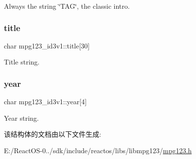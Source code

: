 Always the string \char`\"{}\+T\+A\+G\char`\"{}, the classic intro. \mbox{\label{structmpg123__id3v1_a07f4a232c9be375fc35285538ff08c98}} 
\subsubsection{\texorpdfstring{title}{title}}
{\footnotesize\ttfamily char mpg123\+\_\+id3v1\+::title\mbox{[}30\mbox{]}}

Title string. \mbox{\label{structmpg123__id3v1_a6087be9b3b25b86cafb4d59af51a1c67}} 
\subsubsection{\texorpdfstring{year}{year}}
{\footnotesize\ttfamily char mpg123\+\_\+id3v1\+::year\mbox{[}4\mbox{]}}

Year string. 

该结构体的文档由以下文件生成\+:\begin{DoxyCompactItemize}
\item 
E\+:/\+React\+O\+S-\/0../sdk/include/reactos/libs/libmpg123/\hyperlink{mpg123_8h}{mpg123.\+h}\end{DoxyCompactItemize}
